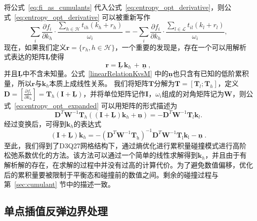 将公式~\ref{eq:fi_as_cumulants} 代入公式~\ref{eq:entropy_opt_derivative}，则公式~\ref{eq:entropy_opt_derivative} 可以被重新写作
\begin{equation}
    \label{eq:entropy_opt_expanded}
    \sum_i \frac{\partial f_i}{\partial k_h} \cdot \frac{\sum_{h \in \mathcal{H}} t_{ih}(k_h + r_h)}{\omega_i} = -\sum_i \frac{\partial f_i}{\partial k_h} \cdot \frac{\sum_{l \in \mathcal{L}} t_{il}(k_l + r_l)}{\omega_i},
\end{equation}
现在，如果我们定义$\bm{r} = \{r_h, h \!\in\! \mathcal{H}\}$，一个重要的发现是，存在一个可以用解析式表达的矩阵$\bm{\underline{L}}$使得
\begin{equation}
    \bm{r} = \bm{\underline{L}} \,\bm{k}_h \,+\,  \bm{\underline{n}}\;, \label{linearRelationKvsM}
\end{equation}
并且$\bm{\underline{L}}$中不含未知量。公式~\ref{linearRelationKvsM} 中的$\bm{\underline{n}}$也只含有已知的低阶累积量，所以$\bm{r}$与$\bm{k}_h$本质上成线性关系。
我们将矩阵$\bm{T}$分解为$\bm{T} = [\bm{T}_l; \bm{T}_h]$，定义$\bm{D} = [\frac{\partial f_i}{\partial k_h}] = \bm{T}_h(\bm{I} + \bm{\underline{L}})$，并将单位矩阵记作$\bm{I}$，$\omega_i$组成的对角矩阵记为$\bm{W}$，则公式~\ref{eq:entropy_opt_expanded} 可以用矩阵的形式描述为
\begin{equation}
    \bm{D}^T \bm{W}^{-1} \bm{T}_h ((\bm{I} + \bm{\underline{L}}) \bm{k}_h + \bm{\underline{n}}) = -\bm{D}^T \bm{W}^{-1} \bm{T}_l \bm{k}_l .
\end{equation}
经过变换后，可得到$\bm{k}_h$的表达式
\begin{equation} \label{eq:solution}
	(\bm{I} + \bm{\underline{L}}) \bm{k}_h =  -(\bm{D}^T \bm{W}^{-1} \bm{T}_\text{h})^{-1}\bm{D}^T \bm{W}^{-1} \bm{T}_\text{l} \bm{k}_\text{l} - \bm{\underline{n}} \;.
\end{equation}
至此，我们得到了D3Q27网格结构下，通过熵优化进行累积量碰撞模式进行高阶松弛系数优化的方法。该方法可以通过一个简单的线性求解得到$\bm{k}_h$，并且由于有解析解的存在，在求解的过程中并没有过高的计算代价。为了避免数值偏移，优化后的累积量要被限制于平衡态和碰撞前的数值之间。剩余的碰撞过程与第~\ref{sec:cumulant} 节中的描述一致。

\subsection{单点插值反弹边界处理}
